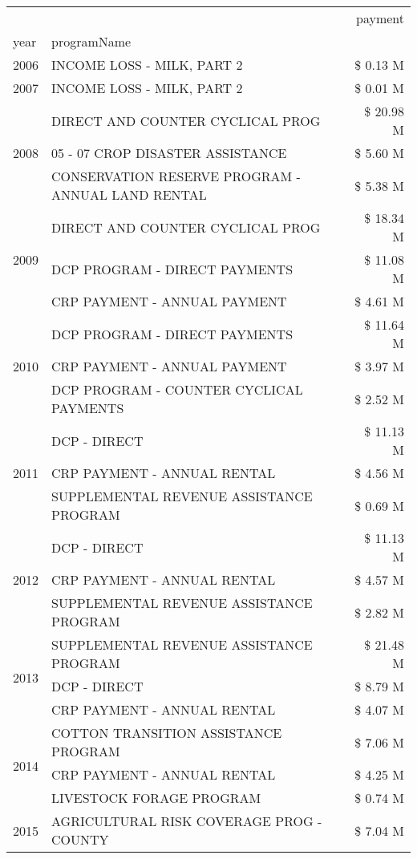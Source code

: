 \begin{tabular}{llr}
\toprule
 &  & payment \\
year & programName &  \\
\midrule
2006 & INCOME LOSS - MILK, PART 2 & \$ 0.13 M \\
\cline{1-3}
2007 & INCOME LOSS - MILK, PART 2 & \$ 0.01 M \\
\cline{1-3}
\multirow[t]{3}{*}{2008} & DIRECT AND COUNTER CYCLICAL PROG & \$ 20.98 M \\
 & 05 - 07 CROP DISASTER ASSISTANCE & \$ 5.60 M \\
 & CONSERVATION RESERVE PROGRAM - ANNUAL LAND RENTAL & \$ 5.38 M \\
\cline{1-3}
\multirow[t]{3}{*}{2009} & DIRECT AND COUNTER CYCLICAL PROG & \$ 18.34 M \\
 & DCP PROGRAM - DIRECT PAYMENTS & \$ 11.08 M \\
 & CRP PAYMENT - ANNUAL PAYMENT & \$ 4.61 M \\
\cline{1-3}
\multirow[t]{3}{*}{2010} & DCP PROGRAM - DIRECT PAYMENTS & \$ 11.64 M \\
 & CRP PAYMENT - ANNUAL PAYMENT & \$ 3.97 M \\
 & DCP PROGRAM - COUNTER CYCLICAL PAYMENTS & \$ 2.52 M \\
\cline{1-3}
\multirow[t]{3}{*}{2011} & DCP - DIRECT & \$ 11.13 M \\
 & CRP PAYMENT - ANNUAL RENTAL & \$ 4.56 M \\
 & SUPPLEMENTAL REVENUE ASSISTANCE PROGRAM & \$ 0.69 M \\
\cline{1-3}
\multirow[t]{3}{*}{2012} & DCP - DIRECT & \$ 11.13 M \\
 & CRP PAYMENT - ANNUAL RENTAL & \$ 4.57 M \\
 & SUPPLEMENTAL REVENUE ASSISTANCE PROGRAM & \$ 2.82 M \\
\cline{1-3}
\multirow[t]{3}{*}{2013} & SUPPLEMENTAL REVENUE ASSISTANCE PROGRAM & \$ 21.48 M \\
 & DCP - DIRECT & \$ 8.79 M \\
 & CRP PAYMENT - ANNUAL RENTAL & \$ 4.07 M \\
\cline{1-3}
\multirow[t]{3}{*}{2014} & COTTON TRANSITION ASSISTANCE PROGRAM & \$ 7.06 M \\
 & CRP PAYMENT - ANNUAL RENTAL & \$ 4.25 M \\
 & LIVESTOCK FORAGE PROGRAM & \$ 0.74 M \\
\cline{1-3}
\multirow[t]{3}{*}{2015} & AGRICULTURAL RISK COVERAGE PROG - COUNTY & \$ 7.04 M \\

\end{tabular}
